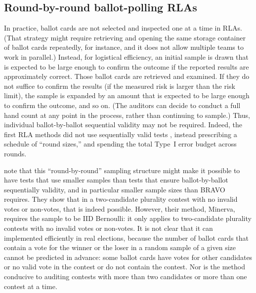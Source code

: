 \documentclass[aoas]{imsart}
\begin{document}
\subsection{Round-by-round ballot-polling RLAs}
In practice, ballot cards are not selected and inspected one at a time in RLAs.
(That strategy might require retrieving and opening the same storage container of ballot cards repeatedly, for instance, and it does not allow
multiple teams to work in parallel.)
Instead, for logistical efficiency, an initial sample is drawn that is expected to be large enough to confirm the outcome if the 
reported results are approximately correct.
Those ballot cards are retrieved and examined.
If they do not suffice to confirm the results (if the measured risk is larger than the risk limit), 
the sample is expanded by an amount that is expected to be large enough
to confirm the outcome, and so on.
(The auditors can decide to conduct a full hand count at any point in the process, rather than continuing to sample.)
Thus, individual ballot-by-ballot sequential validity may not be required.
Indeed, the first RLA methods did not use sequentially valid tests \citep{stark08a,stark09a},
instead prescribing a schedule of ``round sizes,'' and spending the total Type~I error budget across rounds.

\citet{zagorskiEtal21} note that this ``round-by-round'' sampling structure might make it possible to have tests that 
use smaller samples than tests that ensure ballot-by-ballot sequentially validity, and in particular smaller sample sizes than BRAVO
requires.
They show that in a two-candidate plurality contest with no invalid votes or non-votes, that is indeed
possible.
However, their method, Minerva, requires the sample to be IID Bernoulli:
it only applies to  two-candidate plurality contests with no invalid votes or non-votes.
It is not clear that it can implemented efficiently in real elections, because the number of ballot cards that contain a vote for the winner or the
loser in a random sample of a given size cannot be predicted in advance: some ballot cards have votes for other candidates or no valid vote in the contest or do not contain the contest.
Nor is the method conducive to auditing contests with more than two candidates or more than one contest at a time.
\end{document}
